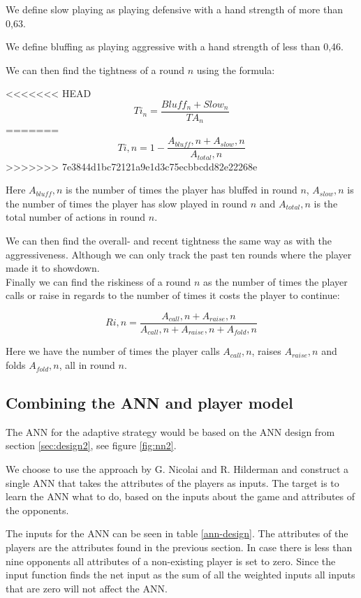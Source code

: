 We define slow playing as playing defensive with a hand strength of more than 0,63.

We define bluffing as playing aggressive with a hand strength of less than 0,46.

We can then find the tightness of a round $n$ using the formula:

<<<<<<< HEAD
\[Ti_{n} = \frac{Bluff_{n} + Slow_{n}}{TA_{n}}\]
=======
\[Ti,n = 1 - \frac{A_{bluff},n + A_{slow},n}{A_{total},n}\]
>>>>>>> 7e3844d1bc72121a9e1d3c75ecbbcdd82e22268e

Here $A_{bluff},n$ is the number of times the player has bluffed in round $n$, $A_{slow},n$ is the number of times the player has slow played in round $n$ and $A_{total},n$ is the total number of actions in round $n$.

We can then find the overall- and recent tightness the same way as with the aggressiveness. Although we can only track the past ten rounds where the player made it to showdown.\\

Finally we can find the riskiness of a round $n$ as the number of times the player calls or raise in regards to the number of times it costs the player to continue:

\[Ri,n = \frac{A_{call},n + A_{raise},n}{A_{call},n + A_{raise},n + A_{fold},n}\]

Here we have the number of times the player calls $A_{call},n$, raises $A_{raise},n$ and folds $A_{fold},n$, all in round $n$.

\subsection{Combining the ANN and player model}
The ANN for the adaptive strategy would be based on the ANN design from section \ref{sec:design2}, see figure \ref{fig:nn2}. 



We choose to use the approach by G. Nicolai and R. Hilderman and construct a single ANN that takes the attributes of the players as inputs. The target is to learn the ANN what to do, based on the inputs about the game and attributes of the opponents.

The inputs for the ANN can be seen in table \ref{ann-design}. The attributes of the players are the attributes found in the previous section. In case there is less than nine opponents all attributes of a non-existing player is set to zero. Since the input function finds the net input as the sum of all the weighted inputs all inputs that are zero will not affect the ANN.

